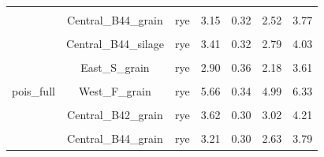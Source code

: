 \documentclass[
]{article}
\begin{document}
\begin{table}[H]
\begin{tabular}[t]{ccccccc}
\cellcolor{gray!6}{pois\_full} & \cellcolor{gray!6}{Central\_B44\_grain} & \cellcolor{gray!6}{no} & \cellcolor{gray!6}{3.33} & \cellcolor{gray!6}{0.32} & \cellcolor{gray!6}{2.70} & \cellcolor{gray!6}{3.95}\\
 & \multirow{-2}{*}{\centering\arraybackslash Central\_B44\_grain} & rye & 3.15 & 0.32 & 2.52 & 3.77\\

\cellcolor{gray!6}{pois\_full} & \cellcolor{gray!6}{Central\_B44\_silage} & \cellcolor{gray!6}{no} & \cellcolor{gray!6}{4.35} & \cellcolor{gray!6}{0.31} & \cellcolor{gray!6}{3.74} & \cellcolor{gray!6}{4.96}\\
 & \multirow{-2}{*}{\centering\arraybackslash Central\_B44\_silage} & rye & 3.41 & 0.32 & 2.79 & 4.03\\

\cellcolor{gray!6}{pois\_full} & \cellcolor{gray!6}{East\_S\_grain} & \cellcolor{gray!6}{no} & \cellcolor{gray!6}{3.32} & \cellcolor{gray!6}{0.36} & \cellcolor{gray!6}{2.62} & \cellcolor{gray!6}{4.02}\\
 & \multirow{-2}{*}{\centering\arraybackslash East\_S\_grain} & rye & 2.90 & 0.36 & 2.18 & 3.61\\

\cellcolor{gray!6}{pois\_full} & \cellcolor{gray!6}{West\_F\_grain} & \cellcolor{gray!6}{no} & \cellcolor{gray!6}{6.02} & \cellcolor{gray!6}{0.34} & \cellcolor{gray!6}{5.35} & \cellcolor{gray!6}{6.69}\\
\multirow{-10}{*}{\centering\arraybackslash pois\_full} & \multirow{-2}{*}{\centering\arraybackslash West\_F\_grain} & rye & 5.66 & 0.34 & 4.99 & 6.33\\
\cmidrule{1-7}
\cellcolor{gray!6}{binom\_out-rm} & \cellcolor{gray!6}{Central\_B42\_grain} & \cellcolor{gray!6}{no} & \cellcolor{gray!6}{2.65} & \cellcolor{gray!6}{0.31} & \cellcolor{gray!6}{2.04} & \cellcolor{gray!6}{3.25}\\
 & \multirow{-2}{*}{\centering\arraybackslash Central\_B42\_grain} & rye & 3.62 & 0.30 & 3.02 & 4.21\\

\cellcolor{gray!6}{binom\_out-rm} & \cellcolor{gray!6}{Central\_B44\_grain} & \cellcolor{gray!6}{no} & \cellcolor{gray!6}{3.45} & \cellcolor{gray!6}{0.29} & \cellcolor{gray!6}{2.88} & \cellcolor{gray!6}{4.03}\\
 & \multirow{-2}{*}{\centering\arraybackslash Central\_B44\_grain} & rye & 3.21 & 0.30 & 2.63 & 3.79\\


\end{tabular}
\end{table}
\end{document}
